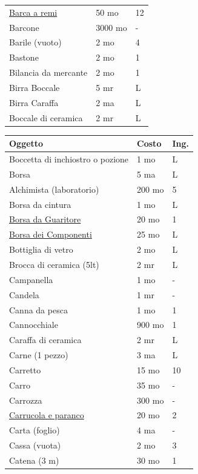 \begin{multicols}{2}
\begin{tabularx}{\linewidth}{Xll}
\hyperlink{Barca a remi}{Barca a remi}& 50 mo& 12\\
\rowcolor{gray!20}Barcone & 3000 mo& -\\
Barile (vuoto)& 2 mo& 4\\
\rowcolor{gray!20}Bastone & 2 mo& 1\\
Bilancia da mercante& 2 mo& 1\\
\rowcolor{gray!20}Birra Boccale& 5 mr& L\\
Birra Caraffa & 2 ma & L\\
\rowcolor{gray!20}Boccale di ceramica & 2 mr & L \\
\end{tabularx}
\noindent\begin{tabular}{p{5cm}p{1.5cm}p{0.7cm}}
\toprule
\rowcolor{gray!20}\textbf{Oggetto} & \textbf{Costo} & \textbf{Ing.} \\
\toprule
Boccetta di inchiostro o pozione & 1 mo & L\\
\rowcolor{gray!20}Borsa & 5 ma & L \\
Alchimista (laboratorio) & 200 mo & 5 \\
\rowcolor{gray!20}Borsa da cintura & 1 mo & L \\
\hyperlink{borsadaguaritore}{Borsa da Guaritore} & 20 mo & 1 \\
\rowcolor{gray!20}\hyperlink{Borsa dei Componenti}{Borsa dei Componenti} & 25 mo & L \\
Bottiglia di vetro & 2 mo & L \\
\rowcolor{gray!20}Brocca di ceramica (5lt) & 2 mr & L \\
Campanella & 1 mo & - \\
\rowcolor{gray!20}Candela & 1 mr & - \\
Canna da pesca & 1 mo & 1 \\
\rowcolor{gray!20}Cannocchiale & 900 mo & 1 \\
Caraffa di ceramica & 2 mr & L \\
\rowcolor{gray!20}Carne (1 pezzo) & 3 ma & L \\
Carretto & 15 mo & 10 \\
\rowcolor{gray!20}Carro & 35 mo & - \\
Carrozza & 300 mo & - \\
\rowcolor{gray!20}\hyperlink{Carrucola e paranco}{Carrucola e paranco} & 20 mo & 2 \\
Carta (foglio) & 4 ma & - \\
\rowcolor{gray!20}Cassa (vuota) & 2 mo & 3 \\
Catena (3 m) & 30 mo & 1 \\

\end{tabular}
\end{multicols}
